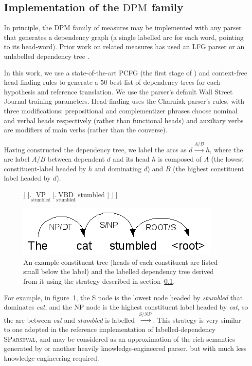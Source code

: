 \documentclass[11pt]{article}
\newcommand{\headlabel}[2]{\ensuremath{\underset{\textrm{#2}}{\textrm{#1}}}}
\newcommand{\arclabel}[1]{\ensuremath{\stackrel{#1}{\to}}}
\newcommand{\DPM}[1]{\ensuremath{\mathrm{DPM}_{#1}}}
\newcommand{\DPMempty}{\ensuremath{\DPM{}}}
\begin{document}
\subsection{Implementation of the \DPMempty{} family}
\label{sec:implementation}
In principle, the \DPM{} family of measures may be implemented with
any parser that generates a dependency graph (a single labelled arc
for each word, pointing to its head-word). Prior work
\cite{owczarzak07labelleddepseval} on related
measures has used an LFG parser \cite{cahill04lfg} or
an unlabelled dependency tree \cite{liu05syntaxformteval}. 

%
In this work, we use a state-of-the-art PCFG (the first stage of
) and context-free head-finding
rules \cite{magerman95headfinding} to generate a 50-best list of
dependency trees for each hypothesis and reference translation.  We
use the parser's default Wall Street Journal training parameters.
Head-finding uses the Charniak parser's rules, with three
modifications: prepositional and complementizer phrases choose nominal
and verbal heads respectively (rather than functional heads) and
auxiliary verbs are modifiers of main verbs (rather than the
converse).

Having constructed the dependency tree, we label the arcs as $d
\stackrel{A/B}{\to} h$, where the arc label $A/B$ between dependent
$d$ and its head $h$ is composed of $A$ (the lowest constituent-label
headed by $h$ and dominating $d$) and $B$ (the highest constituent
label headed by $d$). 
\begin{figure}
  \Tree
  [.\headlabel{S}{stumbled}
    [.\headlabel{NP}{cat}
      [.\headlabel{DT}{the} the ]
      [.\headlabel{NN}{cat} cat ]
    ]
    [.\headlabel{VP}{stumbled} 
      [.\headlabel{VBD}{stumbled} stumbled ]
    ]
  ]
  \\
  \begin{center}
    \includegraphics[scale=0.6]{dpm-example-depextract.png}
  \end{center}
  \caption{An example constituent tree (heads of each constituent are
    listed small below the label) and the labelled dependency tree
    derived from it using the strategy described in
    section~\ref{sec:implementation}.}
  \label{fig:depextract}
\end{figure}
For example, in figure~\ref{fig:depextract}, the S node is the
lowest node headed by \emph{stumbled} that dominates \emph{cat}, and
the NP node is the highest constituent label headed by \emph{cat}, so
the arc between \emph{cat} and \emph{stumbled} is labelled \arclabel{S/NP}.
%
This strategy is very similar to one adopted in the reference
implementation of labelled-dependency \textsc{SParseval}, and may be
considered as an approximation of the rich semantics generated by
\cite{cahill04lfg} or another heavily knowledge-engineered
parser, but with much less knowledge-engineering required.
\end{document}
